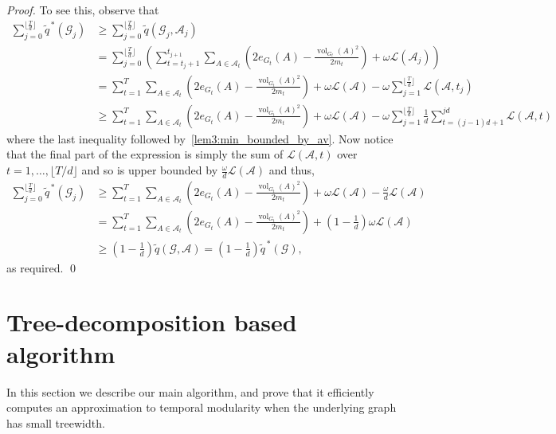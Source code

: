 \documentclass[runningheads]{llncs}
\DeclareMathOperator{\vol}{vol}
\newcommand{\cA}{\mathcal{A}}
\newcommand{\cG}{\mathcal{G}}
\newcommand{\loy}{\mathcal{L}}
\begin{document}
\begin{proof}
    To see this, observe that
    \begin{align*}
        \sum_{j=0}^{\lfloor \frac{T}{d} \rfloor} \widetilde{q}^{\,*}(\cG_j) &\geq \sum_{j=0}^{\lfloor \frac{T}{d} \rfloor} \widetilde{q}(\cG_j,\cA_j) \\
            &= \sum_{j=0}^{\lfloor \frac{T}{d} \rfloor} \left( \sum_{t=t_j+1}^{t_{j+1}} \sum_{A \in \cA_t} \left( 2e_{G_t}(A) - \frac{\vol_{G_t}(A)^2}{2m_t}\right) + \omega \loy(\cA_j)\right) \\
            &= \sum_{t=1}^T \sum_{A \in \cA_t} \left( 2e_{G_t}(A) - \frac{\vol_{G_t}(A)^2}{2m_t}\right) + \omega \loy(\cA) - \omega \sum_{j=1}^{\lfloor \frac{T}{d} \rfloor} \loy(\cA,t_j) \\
            &\geq \sum_{t=1}^T \sum_{A \in \cA_t} \left( 2e_{G_t}(A) - \frac{\vol_{G_t}(A)^2}{2m_t}\right) + \omega \loy(\cA) - \omega \sum_{j=1}^{\lfloor \frac{T}{d} \rfloor} \frac{1}{d} \sum_{t=(j-1)d+1}^{jd} \loy(\cA,t) 
    \end{align*}
    where the last inequality followed by~\eqref{lem3:min_bounded_by_av}. Now notice that the final part of the expression is 
    simply the sum of $\loy(\cA, t)$ over $t=1, \ldots, \lfloor T/d\rfloor$ and so is upper bounded by $\frac{\omega}{d}\loy(\cA)$ and thus,
    \begin{align*}
        \sum_{j=0}^{\lfloor \frac{T}{d} \rfloor} \widetilde{q}^{\,*}(\cG_j) 
            &\geq \sum_{t=1}^T \sum_{A \in \cA_t} \left( 2e_{G_t}(A) - \frac{\vol_{G_t}(A)^2}{2m_t}\right) + \omega \loy(\cA) - \frac{\omega}{d} \loy(\cA) \\
            &= \sum_{t=1}^T \sum_{A \in \cA_t} \left( 2e_{G_t}(A) - \frac{\vol_{G_t}(A)^2}{2m_t}\right) + \left(1-\frac{1}{d}\right)\omega \loy(\cA)\\
            &\geq \left(1 - \frac{1}{d}\right) \widetilde{q}(\cG,\cA)
            = \left(1 - \frac{1}{d}\right) \widetilde{q}^{\,*}(\cG),
    \end{align*}
    as required. \qed
\end{proof}





\section{Tree-decomposition based algorithm}\label{sec:algorithm}

In this section we describe our main algorithm, and prove that it efficiently computes an approximation to temporal modularity when the underlying graph has small treewidth.
\end{document}
